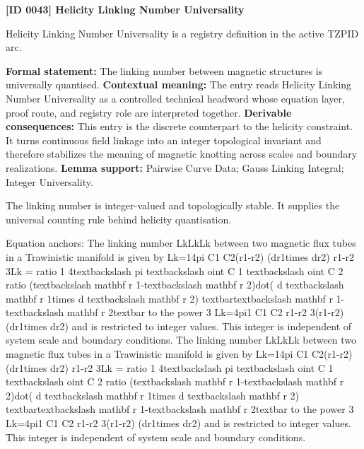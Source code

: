 \clearpage
\noindent\textbf{[ID 0043] Helicity Linking Number Universality}\par
\vspace{0.35em}
\begingroup\small
{}
Helicity Linking Number Universality is a registry definition in the active TZPID arc.

\begingroup\footnotesize\setlength{\emergencystretch}{3em}\sloppy
\textbf{Formal statement:} The linking number between magnetic structures is universally quantised. \textbf{Contextual meaning:} The entry reads Helicity Linking Number Universality as a controlled technical headword whose equation layer, proof route, and registry role are interpreted together. \textbf{Derivable consequences:} This entry is the discrete counterpart to the helicity constraint. It turns continuous field linkage into an integer topological invariant and therefore stabilizes the meaning of magnetic knotting across scales and boundary realizations. \textbf{Lemma support:} Pairwise Curve Data; Gauss Linking Integral; Integer Universality.\par
\endgroup

The linking number is integer-valued and topologically stable. It supplies the universal counting rule behind helicity quantisation.

Equation anchors: The linking number LkLkLk between two magnetic flux tubes in a Trawinistic manifold is given by Lk=14pi C1 C2(r1-r2) (dr1times dr2) r1-r2 3Lk = ratio 1 4textbackslash pi textbackslash oint C 1 textbackslash oint C 2 ratio (textbackslash mathbf r 1-textbackslash mathbf r 2)dot( d textbackslash mathbf r 1times d textbackslash mathbf r 2) textbartextbackslash mathbf r 1-textbackslash mathbf r 2textbar to the power 3 Lk=4pi1 C1 C2 r1-r2 3(r1-r2) (dr1times dr2) and is restricted to integer values. This integer is independent of system scale and boundary conditions. The linking number LkLkLk between two magnetic flux tubes in a Trawinistic manifold is given by Lk=14pi C1 C2(r1-r2) (dr1times dr2) r1-r2 3Lk = ratio 1 4textbackslash pi textbackslash oint C 1 textbackslash oint C 2 ratio (textbackslash mathbf r 1-textbackslash mathbf r 2)dot( d textbackslash mathbf r 1times d textbackslash mathbf r 2) textbartextbackslash mathbf r 1-textbackslash mathbf r 2textbar to the power 3 Lk=4pi1 C1 C2 r1-r2 3(r1-r2) (dr1times dr2) and is restricted to integer values. This integer is independent of system scale and boundary conditions.

